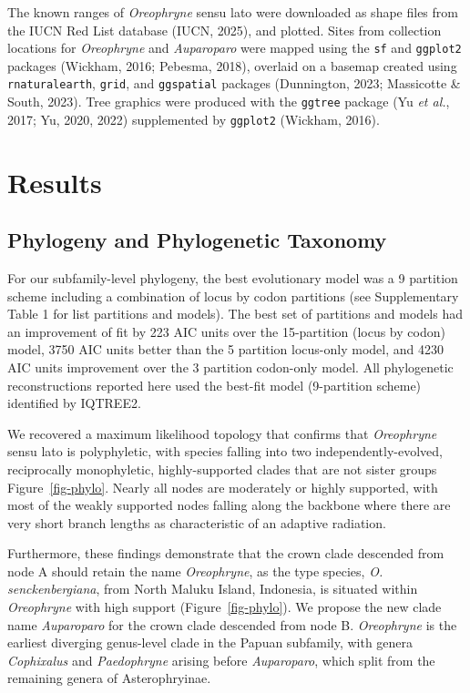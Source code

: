 \documentclass[
  letterpaper,
  DIV=11,
  numbers=noendperiod]{scrartcl}
\begin{document}
The known ranges of \emph{Oreophryne} sensu lato were downloaded as
shape files from the IUCN Red List database (IUCN, 2025), and plotted.
Sites from collection locations for \emph{Oreophryne} and
\emph{Auparoparo} were mapped using the \texttt{sf} and \texttt{ggplot2}
packages (Wickham, 2016; Pebesma, 2018), overlaid on a basemap created
using \texttt{rnaturalearth}, \texttt{grid}, and \texttt{ggspatial}
packages (Dunnington, 2023; Massicotte \& South, 2023). Tree graphics
were produced with the \texttt{ggtree} package (Yu \emph{et al.}, 2017;
Yu, 2020, 2022) supplemented by \texttt{ggplot2} (Wickham, 2016).

\section{Results}\label{results}

\subsection{Phylogeny and Phylogenetic
Taxonomy}\label{phylogeny-and-phylogenetic-taxonomy}

For our subfamily-level phylogeny, the best evolutionary model was a 9
partition scheme including a combination of locus by codon partitions
(see Supplementary Table 1 for list partitions and models). The best set
of partitions and models had an improvement of fit by 223 AIC units over
the 15-partition (locus by codon) model, 3750 AIC units better than the
5 partition locus-only model, and 4230 AIC units improvement over the 3
partition codon-only model. All phylogenetic reconstructions reported
here used the best-fit model (9-partition scheme) identified by IQTREE2.

We recovered a maximum likelihood topology that confirms that
\emph{Oreophryne} sensu lato is polyphyletic, with species falling into
two independently-evolved, reciprocally monophyletic, highly-supported
clades that are not sister groups Figure~\ref{fig-phylo}. Nearly all
nodes are moderately or highly supported, with most of the weakly
supported nodes falling along the backbone where there are very short
branch lengths as characteristic of an adaptive radiation.

Furthermore, these findings demonstrate that the crown clade descended
from node A should retain the name \emph{Oreophryne}, as the type
species, \emph{O. senckenbergiana}, from North Maluku Island, Indonesia,
is situated within \emph{Oreophryne} with high support
(Figure~\ref{fig-phylo}). We propose the new clade name
\emph{Auparoparo} for the crown clade descended from node B.
\emph{Oreophryne} is the earliest diverging genus-level clade in the
Papuan subfamily, with genera \emph{Cophixalus} and \emph{Paedophryne}
arising before \emph{Auparoparo}, which split from the remaining genera
of Asterophryinae.
\end{document}
